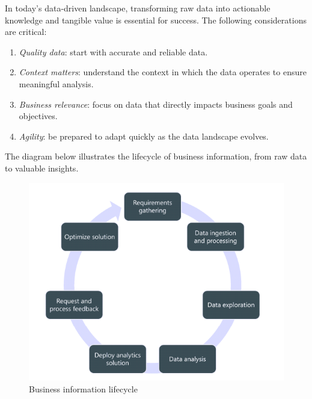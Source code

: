In today's data-driven landscape, transforming raw data into actionable knowledge and tangible value is essential for success. 
The following considerations are critical:
\begin{enumerate}
    \item \textit{Quality data}: start with accurate and reliable data.
    \item \textit{Context matters}: understand the context in which the data operates to ensure meaningful analysis.
    \item \textit{Business relevance}: focus on data that directly impacts business goals and objectives.
    \item \textit{Agility}: be prepared to adapt quickly as the data landscape evolves.
\end{enumerate}

The diagram below illustrates the lifecycle of business information, from raw data to valuable insights.

\begin{figure}[H]
    \centering
    \includegraphics[width=0.5\linewidth]{images/bis10.png}
    \caption{Business information lifecycle}
\end{figure}